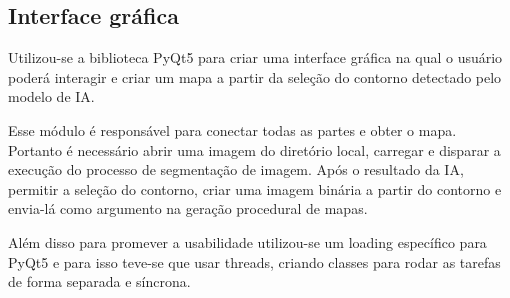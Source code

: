 

\subsection{Interface gráfica}

Utilizou-se a biblioteca PyQt5 para criar uma interface gráfica na qual o usuário poderá interagir e criar um mapa a partir da seleção do contorno detectado pelo modelo de IA.

Esse módulo é responsável para conectar todas as partes e obter o mapa. Portanto é necessário abrir uma imagem do diretório local, carregar e disparar a execução do processo de segmentação de imagem. Após o resultado da IA, permitir a seleção do contorno,  criar uma imagem binária a partir do contorno e envia-lá como argumento na geração procedural de mapas.

Além disso para promever a usabilidade utilizou-se um loading específico para PyQt5 e para isso teve-se que usar threads, criando classes para rodar as tarefas de forma separada e síncrona.